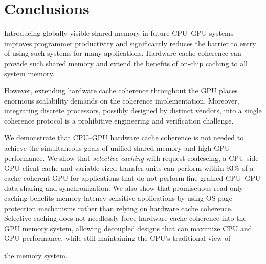 \section{Conclusions}
\label{conclusions}
Introducing globally visible shared memory in future CPU--GPU systems
improves programmer productivity and significantly reduces the barrier
to entry of using such systems for many applications. 
Hardware cache coherence can provide such shared memory and
extend the benefits of on-chip caching to all system memory.
  However, extending hardware cache coherence 
throughout the GPU places enormous
scalability demands on the coherence implementation.  Moreover, integrating
discrete processors, possibly designed by distinct vendors,
into a single coherence protocol is a prohibitive engineering and
verification challenge.  

We demonstrate that CPU--GPU hardware cache coherence is not needed to achieve the
simultaneous goals of unified shared memory and high GPU performance.  
We show that \textit{selective caching} with request coalescing,
a CPU-side GPU client cache and variable-sized transfer units
can perform within 93\% of a
cache-coherent GPU for applications that do not perform fine
grained CPU--GPU data sharing and synchronization. We also show that promiscuous
read-only caching benefits memory latency-sensitive applications by using
OS page-protection mechanisms rather than relying on hardware cache coherence.  Selective caching
does not needlessly force hardware cache coherence into the GPU memory system,
allowing decoupled designs that can maximize CPU and GPU performance, while
still maintaining the CPU's traditional view of the
memory system.
